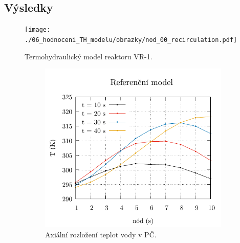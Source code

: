 \subsection{Výsledky}

 
\begin{figure}
	\centering
	\texttt{[image: ./06\_hodnoceni\_TH\_modelu/obrazky/nod\_00\_recirculation.pdf]}
	\caption{Termohydraulický model reaktoru VR-1.}
	\label{fig:nod_00}
\end{figure}


\begin{figure}[H]
	\centering
	\begin{subfigure}{0.5\textwidth}
		\centering
		\includegraphics[width=\textwidth, trim={0cm 0cm 0cm 0cm}, clip]{./05_TH_model_VR_1/grafy/nod_00_temp_distribution_fuel.pdf}
		\caption{Axiální rozložení teplot vody v PČ.}
		\label{fig:temp_fuel_nod00}
	\end{subfigure}%
	\hfill
	\begin{subfigure}{0.5\textwidth}
		\centering

\end{subfigure}
\end{figure}
